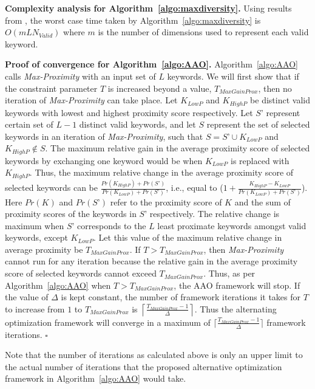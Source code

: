 \textbf{Complexity analysis for Algorithm~\ref{algo:maxdiversity}.} Using results from \cite{GuEfficient96}, the worst case time taken by Algorithm~\ref{algo:maxdiversity} is $O(mLN_{Valid})$ where $m$ is the number of dimensions used to represent each valid keyword. 

\textbf{Proof of convergence for Algorithm~\ref{algo:AAO}.}
Algorithm~\ref{algo:AAO} calls \textit{Max-Proximity} with an input set of $L$ keywords. We will first show that if the constraint parameter $T$ is increased beyond a value, $T_{MaxGainProx}$, then no iteration of \textit{Max-Proximity} can take place. Let $K_{LowP}$ and $K_{HighP}$ be distinct valid keywords with lowest and highest proximity score respectively. Let $S$' represent certain set of $L-1$ distinct valid keywords, and let $S$ represent the set of selected keywords in an iteration of \textit{Max-Proximity}, such that $S = S\text{'} \cup K_{LowP}$ and $K_{HighP} \not\in S$. The maximum relative gain in the average proximity score of selected keywords by exchanging one keyword would be when $K_{LowP}$ is replaced with $K_{HighP}$. Thus, the maximum relative change in the average proximity score of selected keywords can be $\frac{ Pr(K_{HighP}) + Pr(S\text{'})} { Pr(K_{LowP}) + Pr(S\text{'}) }$, i.e., equal to ($1  +  \frac{ K_{HighP} - K_{LowP}}{ Pr(K_{LowP}) + Pr(S\text{'}) }$). Here $Pr(K)$ and $Pr(S\text{'})$ refer to the proximity score of $K$ and the sum of proximity scores of the keywords in $S\text{'}$ respectively. The relative change is maximum when $S\text{'}$ corresponds to the $L$ least proximate keywords amongst valid keywords, except $K_{LowP}$. Let this value of the maximum relative change in average proximity be $T_{MaxGainProx}$. If $T > T_{MaxGainProx}$, then \textit{Max-Proximity} cannot run for any iteration because the relative gain in the average proximity score of selected keywords cannot exceed $T_{MaxGainProx}$. Thus, as per Algorithm~\ref{algo:AAO} when $T > T_{MaxGainProx}$, the AAO framework will stop. If the value of $\Delta$ is kept constant, the number of framework iterations it takes for $T$ to increase from $1$ to $T_{MaxGainProx}$ is $\left \lceil{ \frac{T_{MaxGainProx} -1}{\Delta} }\right \rceil$. Thus the alternating optimization framework will converge in a maximum of   $\lceil \frac{T_{MaxGainProx} -1}{\Delta} \rceil$ framework iterations. \hfill $\square$

Note that the number of iterations as calculated above is only an upper limit to the actual number of iterations that the proposed alternative optimization framework in Algorithm~\ref{algo:AAO} would take. 


